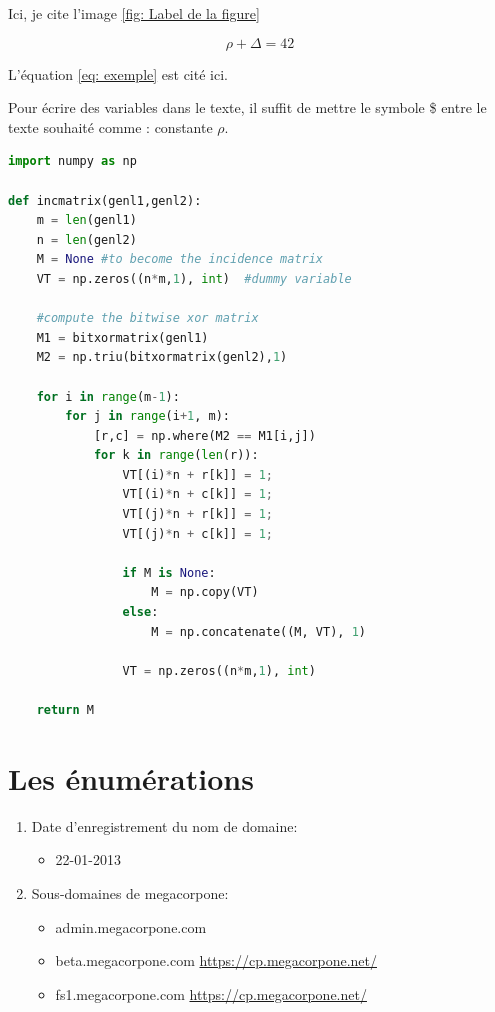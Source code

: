 \documentclass{rapportHenallux}
\begin{document}

Ici, je cite l'image \ref{fig: Label de la figure}



\begin{equation} \label{eq: exemple}
\rho + \Delta = 42
\end{equation}

L'équation \ref{eq: exemple} est cité ici. 


Pour écrire des variables dans le texte, il suffit\cite{einstein} de mettre le symbole \$ entre le texte souhaité comme : constante $\rho$. 
\begin{lstlisting}[language=Python, title=test.py]
import numpy as np
    
def incmatrix(genl1,genl2):
    m = len(genl1)
    n = len(genl2)
    M = None #to become the incidence matrix
    VT = np.zeros((n*m,1), int)  #dummy variable
    
    #compute the bitwise xor matrix
    M1 = bitxormatrix(genl1)
    M2 = np.triu(bitxormatrix(genl2),1) 

    for i in range(m-1):
        for j in range(i+1, m):
            [r,c] = np.where(M2 == M1[i,j])
            for k in range(len(r)):
                VT[(i)*n + r[k]] = 1;
                VT[(i)*n + c[k]] = 1;
                VT[(j)*n + r[k]] = 1;
                VT[(j)*n + c[k]] = 1;
                
                if M is None:
                    M = np.copy(VT)
                else:
                    M = np.concatenate((M, VT), 1)
                
                VT = np.zeros((n*m,1), int)
    
    return M
\end{lstlisting}

\section{Les énumérations}
\begin{enumerate}
    \item Date d'enregistrement du nom de domaine:
    \begin{itemize}
        \item 22-01-2013
    \end{itemize}
    \item Sous-domaines de megacorpone:
    \begin{itemize}
        \item admin.megacorpone.com
        \item beta.megacorpone.com \url{https://cp.megacorpone.net/}
        \item fs1.megacorpone.com \url{https://cp.megacorpone.net/}
    \end{itemize}
\end{enumerate}
\end{document}

